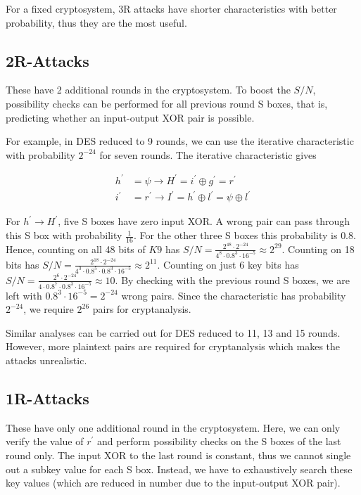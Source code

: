 \documentclass[twoside]{article}
\begin{document}
For a fixed cryptosystem, 3R attacks have shorter characteristics with better
probability, thus they are the most useful.

\subsection{2R-Attacks}
These have 2 additional rounds in the cryptosystem. To boost the \(S/N\),
possibility checks can be performed for all previous round S boxes, that is,
predicting whether an input-output XOR pair is possible.

For example, in DES reduced to 9 rounds, we can use the iterative characteristic
with probability \(2^{-24}\) for seven rounds. The iterative characteristic
gives

\begin{align}
    h^\prime &= \psi \rightarrow H^\prime = i^\prime \oplus g^\prime = r^\prime \label{eq:des-9rd-h} \\
    i^\prime &= r^\prime \rightarrow I^\prime = h^\prime \oplus l^\prime = \psi \oplus l^\prime \label{eq:des-9rd-i}
\end{align}

For \(h^\prime \rightarrow H^\prime\), five S boxes have zero input XOR. A wrong
pair can pass through this S box with probability \(\frac{1}{16}\). For the
other three S boxes this probability is \(0.8\). Hence, counting on all 48 bits
of \(K9\) has \(S/N = \frac{2^{48} \cdot 2^{-24}}{4^8 \cdot 0.8^3 \cdot 16^{-5}}
\approx 2^{29}\). Counting on 18 bits has \(S/N = \frac{2^{18} \cdot
2^{-24}}{4^3 \cdot 0.8^5 \cdot 0.8^3 \cdot 16^{-5}} \approx 2^{11}\). Counting
on just 6 key bits has \(S/N = \frac{2^6 \cdot 2^{-24}}{4 \cdot 0.8^7 \cdot
0.8^3 \cdot 16^{-5}} \approx 10\). By checking with the previous round S boxes,
we are left with \(0.8^3 \cdot 16^{-5} = 2^{-24}\) wrong pairs. Since the
characteristic has probability \(2^{-24}\), we require \(2^{26}\) pairs for
cryptanalysis.

Similar analyses can be carried out for DES reduced to 11, 13 and 15 rounds.
However, more plaintext pairs are required for cryptanalysis which makes the
attacks unrealistic.

\subsection{1R-Attacks}
These have only one additional round in the cryptosystem. Here, we can only
verify the value of \(r^\prime\) and perform possibility checks on the S boxes
of the last round only. The input XOR to the last round is constant, thus we
cannot single out a subkey value for each S box. Instead, we have to
exhaustively search these key values (which are reduced in number due to the
input-output XOR pair).
\end{document}
